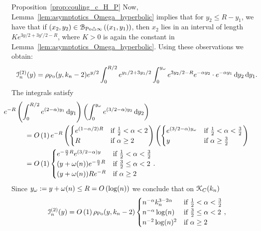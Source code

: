\begin{proofof}{Proposition~\ref{prop:couling_c_H_P}}
Now, Lemma~\ref{lem:asymptotics_Omega_hyperbolic} implies that for 
$y_2 \leq R -y_1$, we have that if 
$(x_2,y_2) \in {\mathcal B}_{{\mathrm{Po}} \bigtriangleup \infty}\left((x_1,y_1)\right)$, then $x_2$ lies in an interval of length 
$Ke^{3 y/2 + 3y'/2 - R}$, where $K >0$ is again the constant in Lemma~\ref{lem:asymptotics_Omega_hyperbolic}. 
Using these observations we obtain: 
\begin{equation} \label{eq:term2_intermediate}
	\mathcal{I}_n^{(2)}(y) = \rho_{{\mathrm{Po}}}(y,k_n-2) e^{y/2}\int_0^{R/2} e^{y_1/2 + 3y_1/2}
	\int_0^{y_\omega} e^{3y_2/2 - R} e^{-\alpha y_2} \cdot e^{-\alpha y_1} \operatorname{\mathrm{d}\hspace{-2pt}} y_2 \operatorname{\mathrm{d}\hspace{-2pt}} y_1. 
\end{equation} 
The integrals satisfy
\begin{align*}
	&\hspace{-30pt} e^{-R}  \left(\int_0^{R/2} e^{(2-\alpha )y_1} \dd y_1\right) 
		\left( \int_0^{y_\omega} e^{(3/2 - \alpha) y_2} \dd y_2 \right)\\
	&= \bigO{1} e^{-R} \left(\begin{cases}
		e^{(1-\alpha/2)R} &\mbox{if } \frac{1}{2} < \alpha < 2\\
		R &\mbox{if } \alpha \ge 2
	\end{cases}\right)
	\left(\begin{cases}
		e^{(3/2 - \alpha)y_\omega} &\mbox{if } \frac{1}{2} < \alpha < \frac{3}{2}\\
		y &\mbox{if } \alpha \ge \frac{3}{2}
	\end{cases}\right)\\
	&= \bigO{1} \begin{cases}
		e^{-\frac{\alpha}{2}R} e^{(3/2 - \alpha)y} &\mbox{if } \frac{1}{2} < \alpha < \frac{3}{2}\\
		(y +\omega(n)) e^{-\frac{\alpha}{2} R} &\mbox{if } \frac{3}{2} \le \alpha < 2\\
		(y + \omega(n)) R e^{-R} &\mbox{if } \alpha \ge 2
	\end{cases}.
\end{align*}
Since $y_\omega := y + \omega(n) \le R = O\left(\log(n)\right)$ we conclude that on ${\mathcal K}_{C}(k_n)$
\[
	\mathcal{I}_n^{(2)}(y) = O\left(1\right) \rho_{{\mathrm{Po}}}(y,k_n-2) \begin{cases}
				n^{-\alpha} k_n^{3 - 2\alpha} &\mbox{if } \frac{1}{2} < \alpha < \frac{3}{2}\\
				n^{-\alpha} \log(n) &\mbox{if } \frac{3}{2} \le \alpha < 2\\
				n^{-2} \log(n)^{2} &\mbox{if } \alpha \ge 2
		\end{cases},
\]
\end{proofof}
